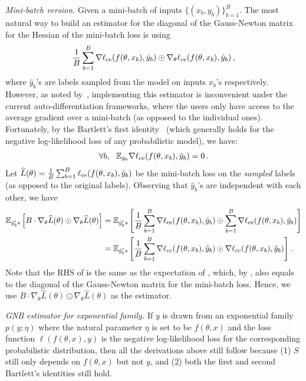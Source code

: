 \textit{Mini-batch version.} Given a mini-batch of inputs $\{(x_b, y_b)\}_{b=1}^B$. The most natural way to build an estimator for the diagonal of the Gauss-Newton matrix for the Hessian of the mini-batch loss is using 
\begin{align}
\frac{1}{B}\sum_{b=1}^B \nabla \ell_{\textup{ce}}(f(\theta,x_b),\hat{y}_b) \odot  \nabla_\theta \ell_{\textup{ce}}(f(\theta,x_b),\hat{y}_b)\,, \label{eqn:23}
\end{align}
where $\hat{y}_b$'s are labels sampled from the model on inputs $x_b$'s respectively. However, as noted by~\citet{grosse2022neural}, implementing this estimator is inconvenient under the current auto-differentiation frameworks, where the users only have access to the average gradient over a mini-batch (as opposed to the individual ones). Fortunately, by the Bartlett's first identity~\citep{bartlett1953approximate} (which generally holds for the negative log-likelihood loss of any probabilistic model), we have:
\begin{align}
\forall b, ~~\mathbb{E}_{\hat{y}_b}\nabla \ell_{\textup{ce}}(f(\theta,x_b),\hat{y}_b) = 0\,.
\end{align}
Let $\widehat L(\theta) = \frac{1}{B}\sum_{b=1}^B \ell_{\textup{ce}}(f(\theta, x_b), \hat{y}_b)$ be the mini-batch loss on the \textit{sampled} labels (as opposed to the original labels). 
Observing that $\hat{y}_b$'s are independent with each other, we have
\begin{align}
\mathbb{E}_{\hat{y}_b's} \left[B \cdot \nabla_\theta \widehat L(\theta) \odot \nabla_\theta \widehat L(\theta)\right] & = 
\mathbb{E}_{\hat{y}_b's} \left[\frac{1}{B} \sum_{b=1}^B \nabla \ell_{\textup{ce}}(f(\theta,x_b),\hat{y}_b) \odot \sum_{b=1}^B \nabla \ell_{\textup{ce}}(f(\theta,x_b),\hat{y}_b)\right] \nonumber \\
& = \mathbb{E}_{\hat{y}_b's} \left[\frac{1}{B} \sum_{b=1}^B \nabla \ell_{\textup{ce}}(f(\theta,x_b),\hat{y}_b) \odot \nabla \ell_{\textup{ce}}(f(\theta,x_b),\hat{y}_b)\right]\,.\label{eqn:20}
\end{align}
Note that the RHS of  is the same as the expectation of , which, by , also equals to the diagonal of the Gauss-Newton matrix for the mini-batch loss.
Hence, we use $B \cdot \nabla_\theta \widehat L(\theta) \odot \nabla_\theta \widehat L(\theta)$ as the estimator.

\textit{GNB estimator for exponential family.} If $y$ is drawn from an exponential family $p(y;\eta)$ where the natural parameter $\eta$ is set to be $f(\theta, x)$ and the loss function $\ell(f(\theta, x), y)$ is the negative log-likelihood loss for the corresponding probabilistic distribution, then all the derivations above still follow because (1) $S$ still only depends on $f(\theta, x)$ but not $y$, and (2) both the first and second Bartlett's identities still hold. 

